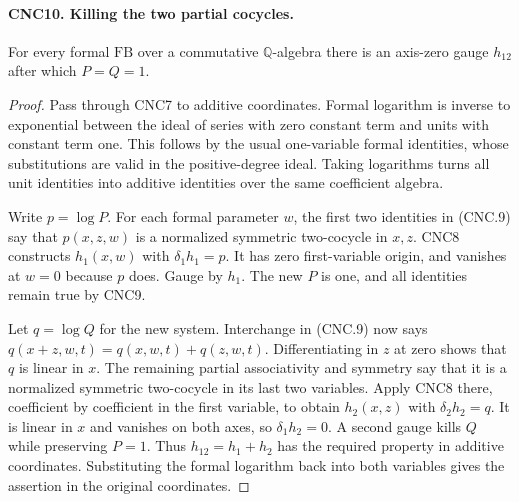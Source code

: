 \documentclass[11pt,a4paper]{article}
\numberwithin{equation}{section}
\theoremstyle{remark}\newtheorem{remark}[theorem]{Remark}
\begin{document}
\paragraph{CNC10. Killing the two partial cocycles.}
\label{claim:CNC10}
For every formal \(\mathrm{FB}\) over a commutative
\(\mathbb Q\)-algebra there is an axis-zero gauge \(h_{12}\)
after which \(P=Q=1\).
\begin{proof}
Pass through CNC7 to additive coordinates.  Formal logarithm is inverse
to exponential between the ideal of series with zero constant term and
units with constant term one.  This follows by the usual one-variable
formal identities, whose substitutions are valid in the positive-degree
ideal.  Taking logarithms turns all unit identities into additive
identities over the same coefficient algebra.

Write \(p=\log P\).  For each formal parameter \(w\), the
first two identities in (CNC.9) say that \(p(x,z,w)\) is a
normalized symmetric two-cocycle in \(x,z\).  CNC8 constructs
\(h_1(x,w)\) with \(\delta_1h_1=p\).  It has zero first-variable
origin, and vanishes at \(w=0\) because \(p\) does.  Gauge by
\(h_1\).  The new \(P\) is one, and all identities remain true
by CNC9.

Let \(q=\log Q\) for the new system.  Interchange in (CNC.9)
now says
\(q(x+z,w,t)=q(x,w,t)+q(z,w,t)\).
Differentiating in \(z\) at zero shows that \(q\) is linear
in \(x\).  The remaining partial associativity and symmetry say
that it is a normalized symmetric two-cocycle in its last two variables.
Apply CNC8 there, coefficient by coefficient in the first variable,
to obtain \(h_2(x,z)\) with \(\delta_2h_2=q\).
It is linear in \(x\) and vanishes on both axes, so
\(\delta_1h_2=0\).  A second gauge kills \(Q\) while preserving
\(P=1\).  Thus \(h_{12}=h_1+h_2\) has the required property
in additive coordinates.  Substituting the formal logarithm back into
both variables gives the assertion in the original coordinates.
\end{proof}

\end{document}
